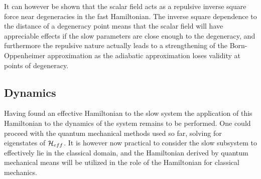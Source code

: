\documentclass[a4paper]{article}
\begin{document}
It can however be shown that the scalar field acts as a repulsive inverse
square force near degeneracies in the fast Hamiltonian\cite{berrylim}. The inverse square dependence to
the distance of a degeneracy point means that the scalar field will have appreciable
effects if the slow parameters are close enough to the degeneracy, and furthermore the
repulsive nature actually leads to a strengthening of the Born-Oppenheimer approximation as
the adiabatic approximation loses validity at points of degeneracy.
\subsection{Dynamics}
Having found an effective Hamiltonian to the slow system the application of this
Hamiltonian to the dynamics of the system remains to be performed. One could proceed with
the quantum mechanical methods used so far, solving for eigenstates of \(\mathbb{\cal
H}_{eff}\). %
It is however now practical to consider the slow subsystem to effectively lie in the
classical domain,
and the Hamiltonian derived by quantum mechanical means will be utilized in the role of the
Hamiltonian for classical mechanics. %
\end{document}
